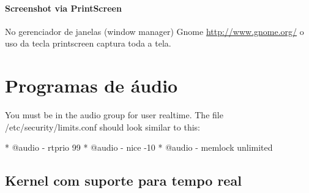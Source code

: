 \documentclass[12pt,brazil]{book}
\begin{document}
\subsection{Screenshot via PrintScreen}
\label{sec:scre-via-printscr}

No gerenciador de janelas (window manager) Gnome
\url{http://www.gnome.org/} o uso da tecla printscreen captura toda a
tela.

\part{Programas de áudio}
\label{part:programas-de-audio}


You must be in the audio group for user realtime. The file /etc/security/limits.conf should look similar to this:

    * @audio - rtprio 99
    * @audio - nice -10
    * @audio - memlock unlimited 


\chapter{Kernel com suporte para tempo real}
\label{cha:kernel-com-suporte}






\end{document}
